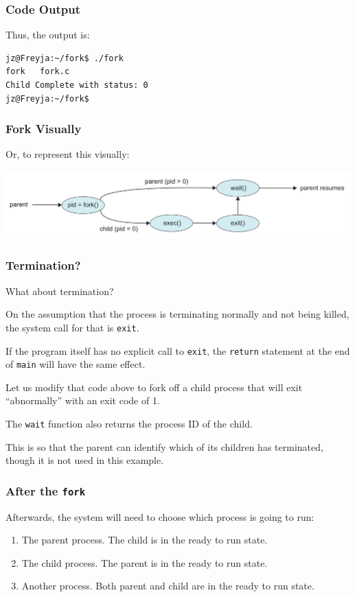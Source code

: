 \begin{frame}[fragile]
\frametitle{Code Output}

Thus, the output is:
\begin{verbatim}
jz@Freyja:~/fork$ ./fork 
fork   fork.c
Child Complete with status: 0
jz@Freyja:~/fork$ 
\end{verbatim}


\end{frame}

\begin{frame}
\frametitle{Fork Visually}

Or, to represent this visually:

\begin{center}
\includegraphics[width=\textwidth]{images/fork-syscall.png}
\end{center}

\end{frame}

\begin{frame}
\frametitle{Termination?}

What about termination? 

On the assumption that the process is terminating normally and not being killed, the system call for that is \texttt{exit}. 

If the program itself has no explicit call to \texttt{exit}, the \texttt{return} statement at the end of \texttt{main} will have the same effect.

Let us modify that code above to fork off a child process that will exit ``abnormally'' with an exit code of 1. 

The \texttt{wait} function also returns the process ID of the child.

 This is so that the parent can identify which of its children has terminated, though it is not used in this example.

\end{frame}

\begin{frame}
\frametitle{After the \texttt{fork}}

Afterwards, the system will need to choose which process is going to run: 

\begin{enumerate}
	\item The parent process. The child is in the ready to run state.
	\item The child process. The parent is in the ready to run state.
	\item Another process. Both parent and child are in the ready to run state.
\end{enumerate}

\end{frame}


